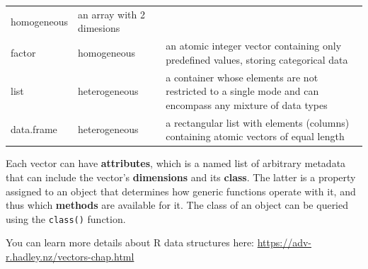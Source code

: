\documentclass[]{book}
\begin{document}
\begin{longtable}[]{@{}lll@{}}
\begin{minipage}[t]{0.10\columnwidth}
homogeneous\strut
\end{minipage} & \begin{minipage}[t]{0.71\columnwidth}\raggedright
an array with 2 dimesions\strut
\end{minipage}\tabularnewline
\begin{minipage}[t]{0.10\columnwidth}\raggedright
factor\strut
\end{minipage} & \begin{minipage}[t]{0.10\columnwidth}\raggedright
homogeneous\strut
\end{minipage} & \begin{minipage}[t]{0.71\columnwidth}\raggedright
an atomic integer vector containing only predefined values, storing categorical data\strut
\end{minipage}\tabularnewline
\begin{minipage}[t]{0.10\columnwidth}\raggedright
list\strut
\end{minipage} & \begin{minipage}[t]{0.10\columnwidth}\raggedright
heterogeneous\strut
\end{minipage} & \begin{minipage}[t]{0.71\columnwidth}\raggedright
a container whose elements are not restricted to a single mode and can encompass any mixture of data types\strut
\end{minipage}\tabularnewline
\begin{minipage}[t]{0.10\columnwidth}\raggedright
data.frame\strut
\end{minipage} & \begin{minipage}[t]{0.10\columnwidth}\raggedright
heterogeneous\strut
\end{minipage} & \begin{minipage}[t]{0.71\columnwidth}\raggedright
a rectangular list with elements (columns) containing atomic vectors of equal length\strut
\end{minipage}\tabularnewline
\bottomrule
\end{longtable}

Each vector can have \textbf{attributes}, which is a named list of arbitrary metadata that can include the vector's \textbf{dimensions} and its \textbf{class}. The latter is a property assigned to an object that determines how generic functions operate with it, and thus which \textbf{methods} are available for it. The class of an object can be queried using the \texttt{class()} function.

You can learn more details about R data structures here: \url{https://adv-r.hadley.nz/vectors-chap.html}
\end{document}
